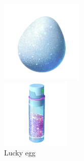 \begin{figure}[h]
  \begin{minipage}[t]{0.3\textwidth}
    \begin{center}
    \includegraphics[width=\textwidth]{images/luckyegg.png}
    \end{center}
    \caption*{Lucky egg}
    \label{fig:luckyegg}
  \end{minipage}
  \begin{minipage}[t]{0.3\textwidth}
    \begin{center}
    \includegraphics[width=\textwidth]{images/stardust.png}

\end{center}
\end{minipage}
\end{figure}
